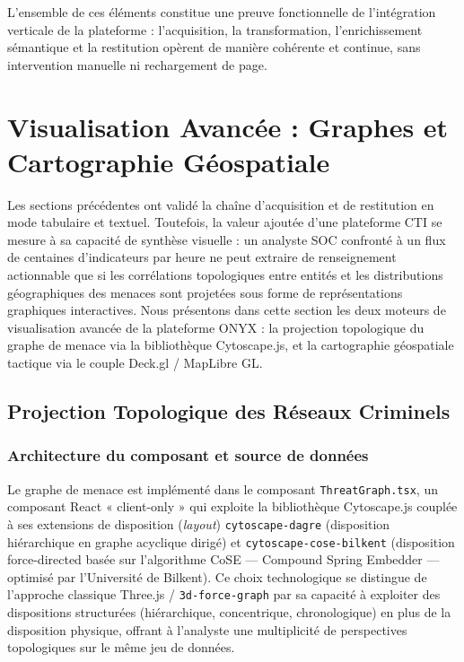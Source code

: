 L'ensemble de ces éléments constitue une preuve fonctionnelle de l'intégration verticale de la plateforme : l'acquisition, la transformation, l'enrichissement sémantique et la restitution opèrent de manière cohérente et continue, sans intervention manuelle ni rechargement de page.


\section{Visualisation Avancée : Graphes et Cartographie Géospatiale}

Les sections précédentes ont validé la chaîne d'acquisition et de restitution en mode tabulaire et textuel. Toutefois, la valeur ajoutée d'une plateforme CTI se mesure à sa capacité de synthèse visuelle : un analyste SOC confronté à un flux de centaines d'indicateurs par heure ne peut extraire de renseignement actionnable que si les corrélations topologiques entre entités et les distributions géographiques des menaces sont projetées sous forme de représentations graphiques interactives. Nous présentons dans cette section les deux moteurs de visualisation avancée de la plateforme ONYX : la projection topologique du graphe de menace via la bibliothèque Cytoscape.js, et la cartographie géospatiale tactique via le couple Deck.gl / MapLibre GL.

\subsection{Projection Topologique des Réseaux Criminels}

\subsubsection{Architecture du composant et source de données}

Le graphe de menace est implémenté dans le composant \texttt{ThreatGraph.tsx}, un composant React « client-only » qui exploite la bibliothèque Cytoscape.js couplée à ses extensions de disposition (\textit{layout}) \texttt{cytoscape-dagre} (disposition hiérarchique en graphe acyclique dirigé) et \texttt{cytoscape-cose-bilkent} (disposition force-directed basée sur l'algorithme CoSE --- Compound Spring Embedder --- optimisé par l'Université de Bilkent). Ce choix technologique se distingue de l'approche classique Three.js / \texttt{3d-force-graph} par sa capacité à exploiter des dispositions structurées (hiérarchique, concentrique, chronologique) en plus de la disposition physique, offrant à l'analyste une multiplicité de perspectives topologiques sur le même jeu de données.

